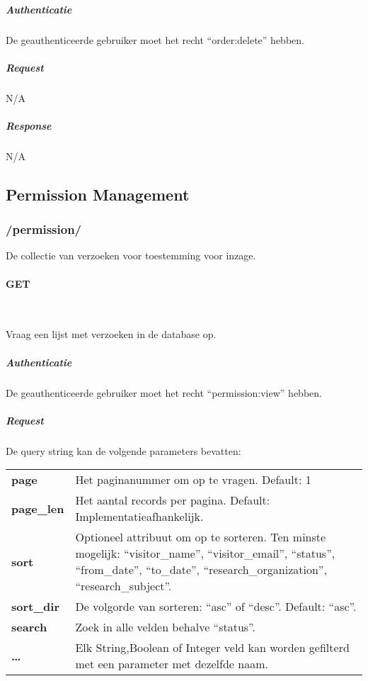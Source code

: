 \documentclass[a4paper,titlepage]{report}
\makeatletter
\def\namedlabel#1#2{
  \label{#1}
  \begingroup
   \def\@currentlabel{#2}%
   \label{#1:name}\endgroup
}
\makeatother
\begin{document}
          \subparagraph{Authenticatie}
            De geauthenticeerde gebruiker moet het recht ``order:delete''
            hebben.

          \subparagraph{Request} N/A

          \subparagraph{Response} N/A

    \pagebreak
    \subsection{Permission Management}
      \subsubsection{/permission/}
        De collectie van verzoeken voor toestemming voor inzage.

        \paragraph{GET}\hfill\\
          \namedlabel{api:permission-list:get}{GET /permission/}
          Vraag een lijst met verzoeken in de database op.

          \subparagraph{Authenticatie}
            De geauthenticeerde gebruiker moet het recht ``permission:view''
            hebben.

          \subparagraph{Request}
            De query string kan de volgende parameters bevatten:\\

            \begin{tabular}{l p{13cm}}
              \textbf{page} & Het paginanummer om op te vragen. Default: 1\\
              \textbf{page\_len} & Het aantal records per pagina. Default:
              Implementatieafhankelijk. \\
              \textbf{sort} & Optioneel attribuut om op te sorteren. Ten
              minste mogelijk: ``visitor\_name'', ``visitor\_email'',
              ``status'', ``from\_date'', ``to\_date'',
              ``research\_organization'', ``research\_subject''. \\
              \textbf{sort\_dir} & De volgorde van sorteren: ``asc'' of
              ``desc''. Default: ``asc''.\\
              \textbf{search} & Zoek in alle velden behalve ``status''.\\
              \textbf{\ldots} & Elk String,Boolean of Integer veld kan worden
                gefilterd met een parameter met dezelfde naam.
            \end{tabular}
\end{document}

